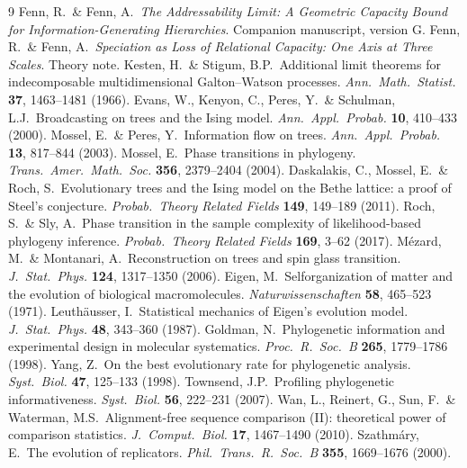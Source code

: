 \documentclass[11pt]{article}
\begin{document}
\begin{thebibliography}{9}\footnotesize
{} Fenn, R.\ \& Fenn, A.\ \emph{The Addressability Limit: A Geometric Capacity Bound for Information-Generating Hierarchies}. Companion manuscript, version G.
 Fenn, R.\ \& Fenn, A.\ \emph{Speciation as Loss of Relational Capacity: One Axis at Three Scales}. Theory note.
 Kesten, H.\ \& Stigum, B.P.\ Additional limit theorems for indecomposable multidimensional Galton--Watson processes. \emph{Ann.\ Math.\ Statist.} \textbf{37}, 1463--1481 (1966).
 Evans, W., Kenyon, C., Peres, Y.\ \& Schulman, L.J.\ Broadcasting on trees and the Ising model. \emph{Ann.\ Appl.\ Probab.} \textbf{10}, 410--433 (2000).
 Mossel, E.\ \& Peres, Y.\ Information flow on trees. \emph{Ann.\ Appl.\ Probab.} \textbf{13}, 817--844 (2003).
 Mossel, E.\ Phase transitions in phylogeny. \emph{Trans.\ Amer.\ Math.\ Soc.} \textbf{356}, 2379--2404 (2004).
 Daskalakis, C., Mossel, E.\ \& Roch, S.\ Evolutionary trees and the Ising model on the Bethe lattice: a proof of Steel's conjecture. \emph{Probab.\ Theory Related Fields} \textbf{149}, 149--189 (2011).
 Roch, S.\ \& Sly, A.\ Phase transition in the sample complexity of likelihood-based phylogeny inference. \emph{Probab.\ Theory Related Fields} \textbf{169}, 3--62 (2017).
 M\'ezard, M.\ \& Montanari, A.\ Reconstruction on trees and spin glass transition. \emph{J.\ Stat.\ Phys.} \textbf{124}, 1317--1350 (2006).
 Eigen, M.\ Selforganization of matter and the evolution of biological macromolecules. \emph{Naturwissenschaften} \textbf{58}, 465--523 (1971).
 Leuth\"ausser, I.\ Statistical mechanics of Eigen's evolution model. \emph{J.\ Stat.\ Phys.} \textbf{48}, 343--360 (1987).
 Goldman, N.\ Phylogenetic information and experimental design in molecular systematics. \emph{Proc.\ R.\ Soc.\ B} \textbf{265}, 1779--1786 (1998).
 Yang, Z.\ On the best evolutionary rate for phylogenetic analysis. \emph{Syst.\ Biol.} \textbf{47}, 125--133 (1998).
 Townsend, J.P.\ Profiling phylogenetic informativeness. \emph{Syst.\ Biol.} \textbf{56}, 222--231 (2007).
 Wan, L., Reinert, G., Sun, F.\ \& Waterman, M.S.\ Alignment-free sequence comparison (II): theoretical power of comparison statistics. \emph{J.\ Comput.\ Biol.} \textbf{17}, 1467--1490 (2010).
 Szathmáry, E.\ The evolution of replicators. \emph{Phil.\ Trans.\ R.\ Soc.\ B} \textbf{355}, 1669--1676 (2000).

\end{thebibliography}
\end{document}
